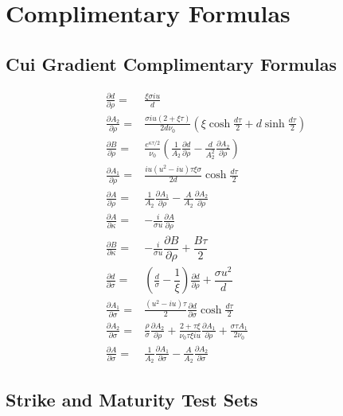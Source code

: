 \documentclass[12,twoside]{mammeTFM}
\theoremstyle{definition}
\theoremstyle{remark}
\begin{document}
\section{Complimentary Formulas}
\subsection{Cui Gradient Complimentary Formulas} \label{app:cui_extra}

\begin{align}
\frac{\partial d}{\partial \rho}=&\frac{\xi \sigma i u}{d} \\
\frac{\partial A_{2}}{\partial \rho}=&\frac{\sigma i u(2+\xi \tau)}{2 d \nu_{0}}\left(\xi \cosh \frac{d \tau}{2}+d \sinh \frac{d \tau}{2}\right) \\
\frac{\partial B}{\partial \rho}=&\frac{e^{\kappa \tau / 2}}{\nu_{0}}\left(\frac{1}{A_{2}} \frac{\partial d}{\partial \rho}-\frac{d}{A_{2}^{2}} \frac{\partial A_{2}}{\partial \rho}\right) \\
\frac{\partial A_{1}}{\partial \rho}=&\frac{i u\left(u^{2}-i u\right) \tau \xi \sigma}{2 d} \cosh \frac{d \tau}{2} \\
\frac{\partial A}{\partial \rho}=&\frac{1}{A_{2}} \frac{\partial A_{1}}{\partial \rho}-\frac{A}{A_{2}} \frac{\partial A_{2}}{\partial \rho}\\
\frac{\partial A}{\partial \kappa}=&-\frac{i}{\sigma u} \frac{\partial A}{\partial \rho}\\
\frac{\partial B}{\partial \kappa}=&-\frac{i}{\sigma u}\dfrac{\partial B}{\partial \rho} + \dfrac{B \tau}{2}\\
\frac{\partial d}{\partial \sigma}=& \left( \frac{d}{\sigma} - \dfrac{1}{\xi} \right) \frac{\partial d}{\partial \rho} + \dfrac{\sigma u^2}{d}\\
\frac{\partial A_{1}}{\partial \sigma}=&\frac{\left(u^{2}-i u\right) \tau}{2} \frac{\partial d}{\partial \sigma} \cosh \frac{d \tau}{2} \\
\frac{\partial A_{2}}{\partial \sigma}=&\frac{\rho}{\sigma} \frac{\partial A_{2}}{\partial \rho}+\frac{2+\tau \xi}{\nu_{0} \tau \xi i u} \frac{\partial A_{1}}{\partial \rho}+\frac{\sigma \tau A_{1}}{2 \nu_{0}} \\
\frac{\partial A}{\partial \sigma}=&\frac{1}{A_{2}} \frac{\partial A_{1}}{\partial \sigma}-\frac{A}{A_{2}} \frac{\partial A_{2}}{\partial \sigma}
\end{align}

\subsection{Strike and Maturity Test Sets}\label{app:strikes}
\end{document}
